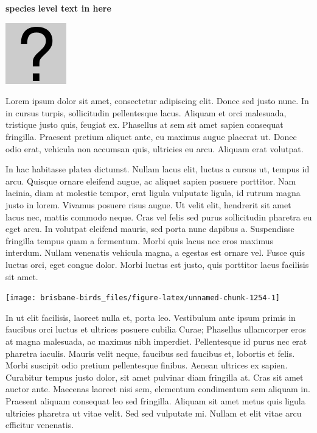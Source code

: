 \documentclass[]{book}
\let\origfigure\figure
\let\endorigfigure\endfigure
\renewenvironment{figure}[1][2] {
  \expandafter\origfigure\expandafter[H]
} {
  \endorigfigure
}
\begin{document}
\textbf{species level text in here}

\begin{figure}
\centering
\includegraphics{assets/missing.png}
\caption{No image for species}
\end{figure}

Lorem ipsum dolor sit amet, consectetur adipiscing elit. Donec sed justo
nunc. In in cursus turpis, sollicitudin pellentesque lacus. Aliquam et
orci malesuada, tristique justo quis, feugiat ex. Phasellus at sem sit
amet sapien consequat fringilla. Praesent pretium aliquet ante, eu
maximus augue placerat ut. Donec odio erat, vehicula non accumsan quis,
ultricies eu arcu. Aliquam erat volutpat.

In hac habitasse platea dictumst. Nullam lacus elit, luctus a cursus ut,
tempus id arcu. Quisque ornare eleifend augue, ac aliquet sapien posuere
porttitor. Nam lacinia, diam at molestie tempor, erat ligula vulputate
ligula, id rutrum magna justo in lorem. Vivamus posuere risus augue. Ut
velit elit, hendrerit sit amet lacus nec, mattis commodo neque. Cras vel
felis sed purus sollicitudin pharetra eu eget arcu. In volutpat eleifend
mauris, sed porta nunc dapibus a. Suspendisse fringilla tempus quam a
fermentum. Morbi quis lacus nec eros maximus interdum. Nullam venenatis
vehicula magna, a egestas est ornare vel. Fusce quis luctus orci, eget
congue dolor. Morbi luctus est justo, quis porttitor lacus facilisis sit
amet.

\begin{figure}
\texttt{[image: brisbane-birds\_files/figure-latex/unnamed-chunk-1254-1]} \caption{insert figure caption}\label{fig:unnamed-chunk-1254}
\end{figure}

In ut elit facilisis, laoreet nulla et, porta leo. Vestibulum ante ipsum
primis in faucibus orci luctus et ultrices posuere cubilia Curae;
Phasellus ullamcorper eros at magna malesuada, ac maximus nibh
imperdiet. Pellentesque id purus nec erat pharetra iaculis. Mauris velit
neque, faucibus sed faucibus et, lobortis et felis. Morbi suscipit odio
pretium pellentesque finibus. Aenean ultrices ex sapien. Curabitur
tempus justo dolor, sit amet pulvinar diam fringilla at. Cras sit amet
auctor ante. Maecenas laoreet nisi sem, elementum condimentum sem
aliquam in. Praesent aliquam consequat leo sed fringilla. Aliquam sit
amet metus quis ligula ultricies pharetra ut vitae velit. Sed sed
vulputate mi. Nullam et elit vitae arcu efficitur venenatis.
\end{document}
